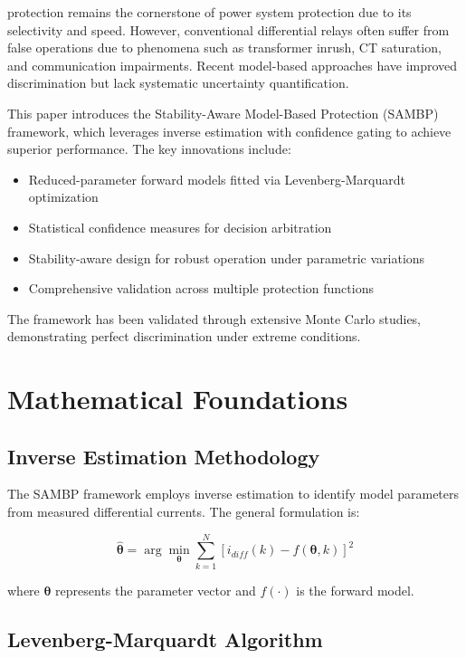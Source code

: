 \documentclass[10pt]{article}
\begin{document}
 protection remains the cornerstone of power system protection due to its selectivity and speed. However, conventional differential relays often suffer from false operations due to phenomena such as transformer inrush, CT saturation, and communication impairments. Recent model-based approaches have improved discrimination but lack systematic uncertainty quantification.

This paper introduces the Stability-Aware Model-Based Protection (SAMBP) framework, which leverages inverse estimation with confidence gating to achieve superior performance. The key innovations include:

\begin{itemize}
\item Reduced-parameter forward models fitted via Levenberg-Marquardt optimization
\item Statistical confidence measures for decision arbitration
\item Stability-aware design for robust operation under parametric variations
\item Comprehensive validation across multiple protection functions
\end{itemize}

The framework has been validated through extensive Monte Carlo studies, demonstrating perfect discrimination under extreme conditions.

\section{Mathematical Foundations}
\label{sec:foundations}

\subsection{Inverse Estimation Methodology}

The SAMBP framework employs inverse estimation to identify model parameters from measured differential currents. The general formulation is:

\begin{equation}
\hat{\boldsymbol{\theta}} = \arg\min_{\boldsymbol{\theta}} \sum_{k=1}^N \left[ i_{diff}(k) - f(\boldsymbol{\theta}, k) \right]^2
\label{eq:inverse}
\end{equation}

where $\boldsymbol{\theta}$ represents the parameter vector and $f(\cdot)$ is the forward model.

\subsection{Levenberg-Marquardt Algorithm}
\end{document}
